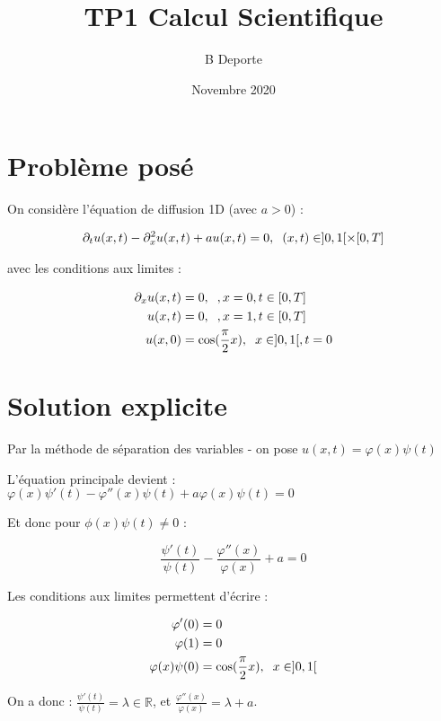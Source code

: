 \documentclass[french]{article}
\title{TP1 Calcul Scientifique}
\author{B Deporte}
\date{Novembre 2020}
\begin{document}
\maketitle

\section{Problème posé}

On considère l'équation de diffusion 1D (avec $ a>0 $) :

\begin{align}
\partial_{t}u(x,t)-\partial_{x}^{2}u(x,t)+au(x,t)=0,\hspace{2mm}(x,t)\in]0,1[\times[0,T]
\end{align}

avec les conditions aux limites :

\begin{align}
\partial_{x}u(x,t)&=0, \hspace{2mm}, x=0, t\in[0,T] \\
u(x,t)&=0, \hspace{2mm}, x=1, t\in[0,T] \\
u(x,0)&=\mathrm{cos}(\frac{\pi}{2}x), \hspace{2mm} x\in]0,1[, t=0
\end{align}

\section{Solution explicite}

Par la méthode de séparation des variables - on pose $ u(x,t)=\varphi(x)\psi(t) $

L'équation principale devient : $ \varphi(x)\psi'(t)-\varphi''(x)\psi(t)+a\varphi(x)\psi(t)=0 $

Et donc pour $ \phi(x)\psi(t) \neq 0 $ :

\[
\frac{\psi'(t)}{\psi(t)}-\frac{\varphi''(x)}{\varphi(x)}+a=0
\]

Les conditions aux limites permettent d'écrire :

\begin{align}
\varphi'(0)&=0 \\
\varphi(1)&=0 \\
\varphi(x)\psi(0)&=\mathrm{cos}(\frac{\pi}{2}x), \hspace{2mm} x\in]0,1[
\end{align}

On a donc : $ \frac{\psi'(t)}{\psi(t)}=\lambda \in \mathbb{R} $, et $ \frac{\varphi''(x)}{\varphi(x)}=\lambda+a $.
\end{document}

